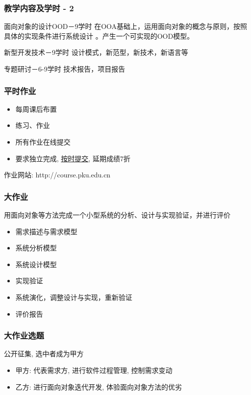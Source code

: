 \documentclass[compress]{beamer}
\begin{document}
\begin{frame}
\frametitle{教学内容及学时 - 2}
\begin{block}{面向对象的设计OOD－9学时}
  在OOA基础上，运用面向对象的概念与原则，按照具体的实现条件进行系统设计
  。产生一个可实现的OOD模型。
\end{block}

\begin{block}{新型开发技术－9学时}
  设计模式，新范型，新技术，新语言等
\end{block}

\begin{block}{专题研讨－6-9学时}
  技术报告，项目报告
\end{block}
\end{frame}

\begin{frame}
  \frametitle{平时作业}
  \begin{itemize}
    \item 每周课后布置
    \item 练习、作业
    \item 所有作业在线提交
    \item 要求独立完成, \uline{按时提交}, 延期成绩7折
  \end{itemize}
  作业网站: http://course.pku.edu.cn
\end{frame}

\begin{frame}
  \frametitle{大作业}
    用面向对象等方法完成一个小型系统的分析、设计与实现验证，并进行评价
  \begin{itemize}
    \item 需求描述与需求模型
    \item 系统分析模型
    \item 系统设计模型
    \item 实现验证
    \item 系统演化，调整设计与实现，重新验证
    \item 评价报告
  \end{itemize}
\end{frame}

\begin{frame}
  \frametitle{大作业选题}

  公开征集, 选中者成为甲方

  \begin{itemize}
      \item 甲方: 代表需求方, 进行软件过程管理, 控制需求变动
      \item 乙方: 进行面向对象迭代开发, 体验面向对象方法的优劣
  \end{itemize}

\end{frame}
\end{document}
